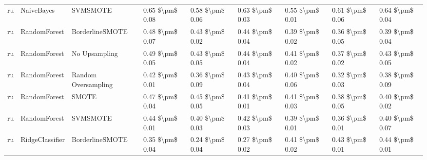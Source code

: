 \begin{tabular}{lllllllll}
      ru &                      NaiveBayes &                      SVMSMOTE &     0.65 \$\textbackslash pm\$ 0.08 &           0.58 \$\textbackslash pm\$ 0.06 &       0.63 \$\textbackslash pm\$ 0.03 &        0.55 \$\textbackslash pm\$ 0.01 &                         0.61 \$\textbackslash pm\$ 0.06 &     0.64 \$\textbackslash pm\$ 0.04 \\
      ru &                    RandomForest &               BorderlineSMOTE &     0.48 \$\textbackslash pm\$ 0.07 &           0.43 \$\textbackslash pm\$ 0.02 &       0.44 \$\textbackslash pm\$ 0.04 &        0.39 \$\textbackslash pm\$ 0.02 &                         0.36 \$\textbackslash pm\$ 0.05 &     0.39 \$\textbackslash pm\$ 0.04 \\
      ru &                    RandomForest &                 No Upsampling &     0.49 \$\textbackslash pm\$ 0.05 &           0.43 \$\textbackslash pm\$ 0.05 &       0.44 \$\textbackslash pm\$ 0.04 &        0.41 \$\textbackslash pm\$ 0.02 &                         0.37 \$\textbackslash pm\$ 0.02 &     0.43 \$\textbackslash pm\$ 0.05 \\
      ru &                    RandomForest &           Random Oversampling &     0.42 \$\textbackslash pm\$ 0.01 &           0.36 \$\textbackslash pm\$ 0.09 &       0.43 \$\textbackslash pm\$ 0.04 &        0.40 \$\textbackslash pm\$ 0.06 &                         0.32 \$\textbackslash pm\$ 0.03 &     0.38 \$\textbackslash pm\$ 0.09 \\
      ru &                    RandomForest &                         SMOTE &     0.47 \$\textbackslash pm\$ 0.04 &           0.45 \$\textbackslash pm\$ 0.05 &       0.41 \$\textbackslash pm\$ 0.01 &        0.41 \$\textbackslash pm\$ 0.03 &                         0.38 \$\textbackslash pm\$ 0.05 &     0.40 \$\textbackslash pm\$ 0.02 \\
      ru &                    RandomForest &                      SVMSMOTE &     0.44 \$\textbackslash pm\$ 0.01 &           0.40 \$\textbackslash pm\$ 0.03 &       0.42 \$\textbackslash pm\$ 0.03 &        0.39 \$\textbackslash pm\$ 0.01 &                         0.36 \$\textbackslash pm\$ 0.01 &     0.40 \$\textbackslash pm\$ 0.07 \\
      ru &                 RidgeClassifier &               BorderlineSMOTE &     0.35 \$\textbackslash pm\$ 0.04 &           0.24 \$\textbackslash pm\$ 0.04 &       0.27 \$\textbackslash pm\$ 0.02 &        0.41 \$\textbackslash pm\$ 0.02 &                         0.43 \$\textbackslash pm\$ 0.01 &     0.44 \$\textbackslash pm\$ 0.01 \\

\end{tabular}
